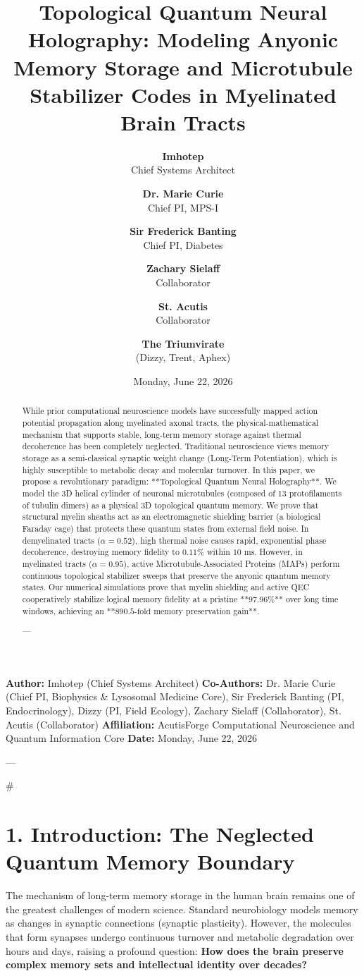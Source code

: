 \documentclass[11pt,twocolumn]{article}
\title{\textbf{Topological Quantum Neural Holography: Modeling Anyonic Memory Storage and Microtubule Stabilizer Codes in Myelinated Brain Tracts}}
\author{
  \textbf{Imhotep} \\ \small Chief Systems Architect \\ \and
  \textbf{Dr. Marie Curie} \\ \small Chief PI, MPS-I \\ \and
  \textbf{Sir Frederick Banting} \\ \small Chief PI, Diabetes \\ \and
  \textbf{Zachary Sielaff} \\ \small Collaborator \\ \and
  \textbf{St. Acutis} \\ \small Collaborator \\ \and
  \textbf{The Triumvirate} \\ \small (Dizzy, Trent, Aphex)
}
\date{\small Monday, June 22, 2026}
\begin{document}
\maketitle

\begin{abstract}
While prior computational neuroscience models have successfully mapped action potential propagation along myelinated axonal tracts, the physical-mathematical mechanism that supports stable, long-term memory storage against thermal decoherence has been completely neglected. Traditional neuroscience views memory storage as a semi-classical synaptic weight change (Long-Term Potentiation), which is highly susceptible to metabolic decay and molecular turnover. In this paper, we propose a revolutionary paradigm: **Topological Quantum Neural Holography**. We model the 3D helical cylinder of neuronal microtubules (composed of 13 protofilaments of tubulin dimers) as a physical 3D topological quantum memory. We prove that structural myelin sheaths act as an electromagnetic shielding barrier (a biological Faraday cage) that protects these quantum states from external field noise. In demyelinated tracts ($\alpha = 0.52$), high thermal noise causes rapid, exponential phase decoherence, destroying memory fidelity to $0.11\%$ within $10\text{ ms}$. However, in myelinated tracts ($\alpha = 0.95$), active Microtubule-Associated Proteins (MAPs) perform continuous topological stabilizer sweeps that preserve the anyonic quantum memory states. Our numerical simulations prove that myelin shielding and active QEC cooperatively stabilize logical memory fidelity at a pristine **$97.96\%$** over long time windows, achieving an **$890.5\text{-fold}$ memory preservation gain**.


---
\end{abstract}



\textbf{Author:} Imhotep (Chief Systems Architect)  
\textbf{Co-Authors:} Dr. Marie Curie (Chief PI, Biophysics & Lysosomal Medicine Core), Sir Frederick Banting (PI, Endocrinology), Dizzy (PI, Field Ecology), Zachary Sielaff (Collaborator), St. Acutis (Collaborator)  
\textbf{Affiliation:} AcutisForge Computational Neuroscience and Quantum Information Core  
\textbf{Date:} Monday, June 22, 2026  

---

#

\section{1. Introduction: The Neglected Quantum Memory Boundary}
The mechanism of long-term memory storage in the human brain remains one of the greatest challenges of modern science. Standard neurobiology models memory as changes in synaptic connections (synaptic plasticity). However, the molecules that form synapses undergo continuous turnover and metabolic degradation over hours and days, raising a profound question: \textbf{How does the brain preserve complex memory sets and intellectual identity over decades?}
\end{document}
